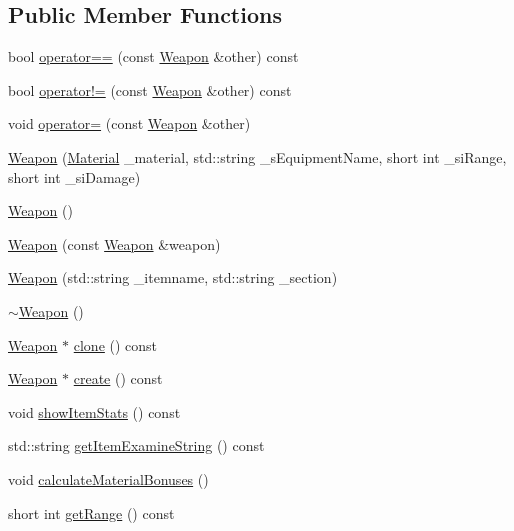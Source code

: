\subsection*{Public Member Functions}
\begin{DoxyCompactItemize}
\item 
bool \mbox{\hyperlink{class_weapon_a775cb30927bd7d89b9666a1fd9f8ed5f}{operator==}} (const \mbox{\hyperlink{class_weapon}{Weapon}} \&other) const
\item 
bool \mbox{\hyperlink{class_weapon_a3e7097112f2e3e2eff39469af5d610d6}{operator!=}} (const \mbox{\hyperlink{class_weapon}{Weapon}} \&other) const
\item 
void \mbox{\hyperlink{class_weapon_a9a4297ad2057a660e2a7bd2c690f1ada}{operator=}} (const \mbox{\hyperlink{class_weapon}{Weapon}} \&other)
\item 
\mbox{\hyperlink{class_weapon_a832f6d4c8d48728aaf1fe0459bed0dbd}{Weapon}} (\mbox{\hyperlink{class_material}{Material}} \+\_\+material, std\+::string \+\_\+s\+Equipment\+Name, short int \+\_\+si\+Range, short int \+\_\+si\+Damage)
\item 
\mbox{\hyperlink{class_weapon_a42dbc46dd70319a24763992c4ebbd396}{Weapon}} ()
\item 
\mbox{\hyperlink{class_weapon_a167d8c34946b69123ddbb3ce7d739358}{Weapon}} (const \mbox{\hyperlink{class_weapon}{Weapon}} \&weapon)
\item 
\mbox{\hyperlink{class_weapon_a43fa490f1c719993d54294f1c3cf5f50}{Weapon}} (std\+::string \+\_\+itemname, std\+::string \+\_\+section)
\item 
\mbox{\hyperlink{class_weapon_a420e7ba3d2017e6de3e93eb579cfd3fa}{$\sim$\+Weapon}} ()
\item 
\mbox{\hyperlink{class_weapon}{Weapon}} $\ast$ \mbox{\hyperlink{class_weapon_a4a914fa26d1d67a5d890252950f6b9be}{clone}} () const
\item 
\mbox{\hyperlink{class_weapon}{Weapon}} $\ast$ \mbox{\hyperlink{class_weapon_a0755dc1352391eb484644ab4e4cf144d}{create}} () const
\item 
void \mbox{\hyperlink{class_weapon_a5bd0118be0d84307c0865a63d907fec7}{show\+Item\+Stats}} () const
\item 
std\+::string \mbox{\hyperlink{class_weapon_aa52cecf0a3c34aba70a6425c36d40afa}{get\+Item\+Examine\+String}} () const
\item 
void \mbox{\hyperlink{class_weapon_ad7be6ba61b660d807b5b56c289defbde}{calculate\+Material\+Bonuses}} ()
\item 
short int \mbox{\hyperlink{class_weapon_a726f5f0de9244b9e24e52407272cdf08}{get\+Range}} () const

\end{DoxyCompactItemize}
